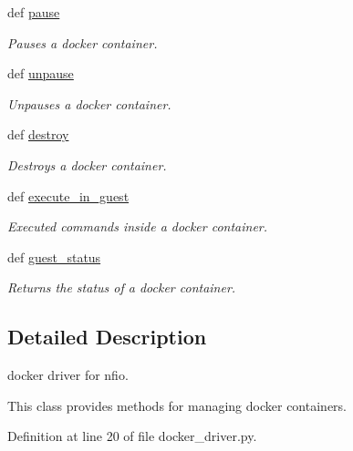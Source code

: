 \begin{DoxyCompactItemize}
def \hyperlink{classhypervisor_1_1docker__driver_1_1DockerDriver_a9ffd3b0cb02e1f292a609e1d500e683f}{pause}
\begin{DoxyCompactList}\small\item\em Pauses a docker container. \end{DoxyCompactList}\item 
def \hyperlink{classhypervisor_1_1docker__driver_1_1DockerDriver_a70f14b7780fadfd2944f1518d43a9029}{unpause}
\begin{DoxyCompactList}\small\item\em Unpauses a docker container. \end{DoxyCompactList}\item 
def \hyperlink{classhypervisor_1_1docker__driver_1_1DockerDriver_ad66fd3d60fbee2760aa6b66d996eff3c}{destroy}
\begin{DoxyCompactList}\small\item\em Destroys a docker container. \end{DoxyCompactList}\item 
def \hyperlink{classhypervisor_1_1docker__driver_1_1DockerDriver_a3df8e1aeea3e30e2fef5a5d41de08159}{execute\-\_\-in\-\_\-guest}
\begin{DoxyCompactList}\small\item\em Executed commands inside a docker container. \end{DoxyCompactList}\item 
def \hyperlink{classhypervisor_1_1docker__driver_1_1DockerDriver_aabbac18594c9b6a4ee869846996c26ae}{guest\-\_\-status}
\begin{DoxyCompactList}\small\item\em Returns the status of a docker container. \end{DoxyCompactList}\end{DoxyCompactItemize}


\subsection{Detailed Description}
docker driver for nfio. 

This class provides methods for managing docker containers. 

Definition at line 20 of file docker\-\_\-driver.\-py.




